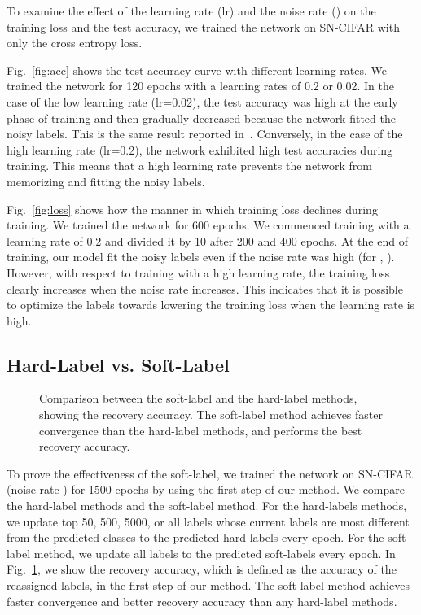 \documentclass[10pt,twocolumn,letterpaper]{article}
\newcommand{\Fref}[1]{Fig.~\ref{#1}}
\begin{document}
To examine the effect of the learning rate (lr) and the noise rate () on the training loss and the test accuracy, we trained the network on SN-CIFAR with only the cross entropy loss.

\Fref{fig:acc} shows the test accuracy curve with different learning rates. We trained the network for 120 epochs with a learning rates of 0.2 or 0.02. In the case of the low learning rate (lr=0.02), the test accuracy was high at the early phase of training and then gradually decreased because the network fitted the noisy labels. This is the same result reported in~\cite{arpit2017closer}. Conversely, in the case of the high learning rate (lr=0.2), the network exhibited high test accuracies during training. This means that a high learning rate prevents the network from memorizing and fitting the noisy labels.

\Fref{fig:loss} shows how the manner in which training loss declines during training. We trained the network for 600 epochs. We commenced training with a learning rate of 0.2 and divided it by 10 after 200 and 400 epochs. At the end of training, our model fit the noisy labels even if the noise rate was high (for \eg, ). However, with respect to training with a high learning rate, the training loss clearly increases when the noise rate increases. This indicates that it is possible to optimize the labels towards lowering the training loss when the learning rate is high.

\subsection{Hard-Label vs. Soft-Label}\label{sec:vs}
\begin{figure}[t]
  \vspace{-5mm}
  \centering
  \caption{Comparison between the soft-label and the hard-label methods, showing the recovery accuracy. The soft-label method achieves faster convergence than the hard-label methods, and performs the best recovery accuracy.}
  \label{fig:hard}
  \vspace{-5mm}
\end{figure}

To prove the effectiveness of the soft-label, we trained the network on SN-CIFAR (noise rate ) for 1500 epochs by using the first step of our method. We compare the hard-label methods and the soft-label method. For the hard-labels methods, we update top 50, 500, 5000, or all labels whose current labels are most different from the predicted classes to the predicted hard-labels every epoch. For the soft-label method, we update all labels to the predicted soft-labels every epoch.
In \Fref{fig:hard}, we show the recovery accuracy, which is defined as the accuracy of the reassigned labels, in the first step of our method. The soft-label method achieves faster convergence and better recovery accuracy than any hard-label methods.
\end{document}
